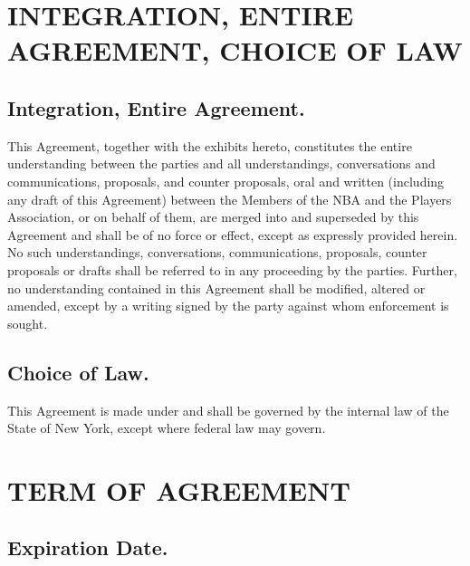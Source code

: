 \documentclass[
]{book}
\begin{document}
\hypertarget{integration-entire-agreement-choice-of-law}{%
\chapter{INTEGRATION, ENTIRE AGREEMENT, CHOICE OF LAW}\label{integration-entire-agreement-choice-of-law}}


\hypertarget{integration-entire-agreement.}{%
\section{Integration, Entire Agreement.}\label{integration-entire-agreement.}}

This Agreement, together with the exhibits hereto, constitutes the entire understanding between the parties and all understandings, conversations and communications, proposals, and counter proposals, oral and written (including any draft of this Agreement) between the Members of the NBA and the Players Association, or on behalf of them, are merged into and superseded by this Agreement and shall be of no force or effect, except as expressly provided herein. No such understandings, conversations, communications, proposals, counter proposals or drafts shall be referred to in any proceeding by the parties. Further, no understanding contained in this Agreement shall be modified, altered or amended, except by a writing signed by the party against whom enforcement is sought.

\hypertarget{choice-of-law.}{%
\section{Choice of Law.}\label{choice-of-law.}}

This Agreement is made under and shall be governed by the internal law of the State of New York, except where federal law may govern.

\hypertarget{term-of-agreement}{%
\chapter{TERM OF AGREEMENT}\label{term-of-agreement}}

\hypertarget{expiration-date.}{%
\section{Expiration Date.}\label{expiration-date.}}
\end{document}
